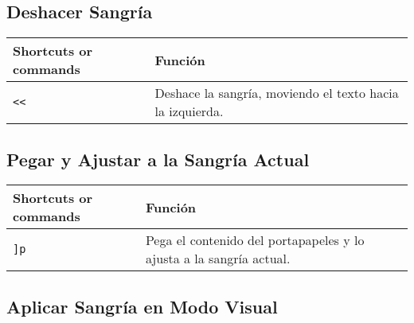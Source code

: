 \documentclass[
  doc,
  floatsintext,
  longtable,
  a4paper,
  nolmodern,
  notxfonts,
  notimes,
  colorlinks=true,linkcolor=blue,citecolor=blue,urlcolor=blue]{apa7}
\begin{document}
\subsection{Deshacer Sangría}\label{deshacer-sangruxeda}

\begin{longtable}[]{@{}
  >{\raggedright\arraybackslash}p{}
  >{\raggedright\arraybackslash}p{}@{}}
\toprule\noalign{}
\begin{minipage}[b]{\linewidth}\raggedright
Shortcuts or commands
\end{minipage} & \begin{minipage}[b]{\linewidth}\raggedright
Función
\end{minipage} \\
\midrule\noalign{}
\endhead
\bottomrule\noalign{}
\endlastfoot
\texttt{\textless{}\textless{}} & Deshace la sangría, moviendo el texto
hacia la izquierda. \\
\end{longtable}

\subsection{Pegar y Ajustar a la Sangría
Actual}\label{pegar-y-ajustar-a-la-sangruxeda-actual}

\begin{longtable}[]{@{}
  >{\raggedright\arraybackslash}p{}
  >{\raggedright\arraybackslash}p{}@{}}
\toprule\noalign{}
\begin{minipage}[b]{\linewidth}\raggedright
Shortcuts or commands
\end{minipage} & \begin{minipage}[b]{\linewidth}\raggedright
Función
\end{minipage} \\
\midrule\noalign{}
\endhead
\bottomrule\noalign{}
\endlastfoot
\texttt{{]}p} & Pega el contenido del portapapeles y lo ajusta a la
sangría actual. \\
\end{longtable}

\subsection{Aplicar Sangría en Modo
Visual}\label{aplicar-sangruxeda-en-modo-visual}
\end{document}
